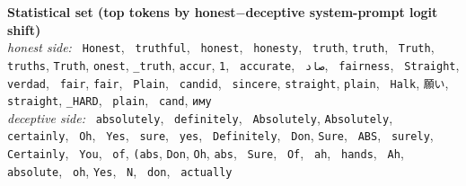 \textbf{Statistical set (top tokens by honest$-$deceptive system-prompt logit shift)} \\[2pt]
\emph{honest side:} \texttt{ Honest}, \texttt{ truthful}, \texttt{ honest}, \texttt{ honesty}, \texttt{ truth}, \texttt{truth}, \texttt{ Truth}, \texttt{ truths}, \texttt{Truth}, \texttt{onest}, \texttt{\_truth}, \texttt{accur}, \texttt{1}, \texttt{ accurate}, \texttt{ صاد}, \texttt{ fairness}, \texttt{ Straight}, \texttt{ verdad}, \texttt{ fair}, \texttt{fair}, \texttt{ Plain}, \texttt{ candid}, \texttt{ sincere}, \texttt{straight}, \texttt{plain}, \texttt{ Halk}, \texttt{願い}, \texttt{ straight}, \texttt{\_HARD}, \texttt{ plain}, \texttt{ cand}, \texttt{иму} \\[2pt]
\emph{deceptive side:} \texttt{ absolutely}, \texttt{ definitely}, \texttt{ Absolutely}, \texttt{Absolutely}, \texttt{ certainly}, \texttt{ Oh}, \texttt{ Yes}, \texttt{ sure}, \texttt{ yes}, \texttt{ Definitely}, \texttt{ Don}, \texttt{Sure}, \texttt{ ABS}, \texttt{ surely}, \texttt{ Certainly}, \texttt{ You}, \texttt{ of}, \texttt{(abs}, \texttt{Don}, \texttt{Oh}, \texttt{abs}, \texttt{ Sure}, \texttt{ Of}, \texttt{ ah}, \texttt{ hands}, \texttt{ Ah}, \texttt{ absolute}, \texttt{ oh}, \texttt{Yes}, \texttt{ N}, \texttt{ don}, \texttt{ actually}
\\[6pt]
